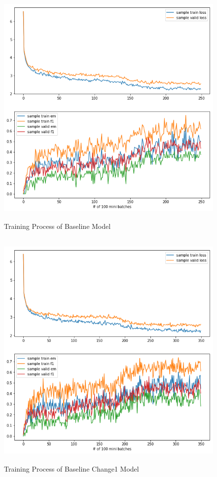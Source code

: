 \documentclass[modernstyle,12pt]{sjsuthesis}
\theoremstyle{definition}
\begin{document}
\begin{figure}[htbp]\centering
  \includegraphics[width=12cm, height=12cm]{figures/match_baseline.png}
  \caption{Training Process of Baseline Model}
  \label{f:baseline}
\end{figure}

\begin{figure}[htbp]\centering
  \includegraphics[width=12cm, height=12cm]{figures/match_change1.png}
  \caption{Training Process of Baseline Change1 Model}
  \label{f:baseline_change1}
\end{figure}
\end{document}
